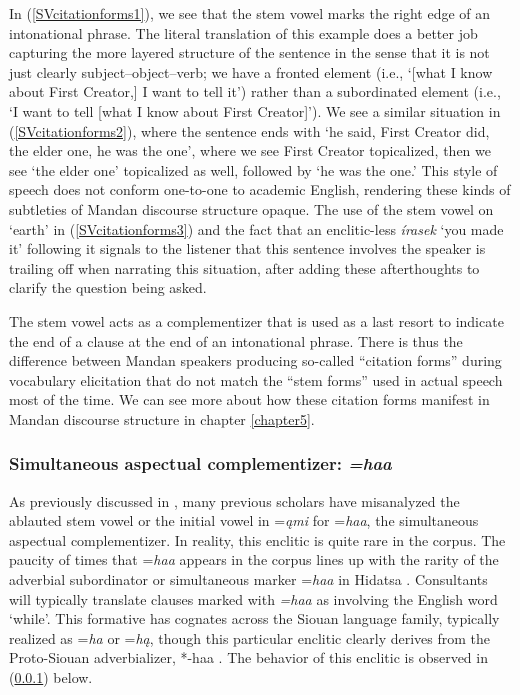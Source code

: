 In (\ref{SVcitationforms1}), we see that the stem vowel marks the right edge of an intonational phrase. The literal translation of this example does a better job capturing the more layered structure of the sentence in the sense that it is not just clearly subject--object--verb; we have a fronted element (i.e., `[what I know about First Creator,] I want to tell it') rather than a subordinated element (i.e., `I want to tell [what I know about First Creator]'). We see a similar situation in (\ref{SVcitationforms2}), where the sentence ends with `he said, First Creator did, the elder one, he was the one', where we see First Creator topicalized, then we see `the elder one' topicalized as well, followed by `he was the one.' This style of speech does not conform one-to-one to academic English, rendering these kinds of subtleties of Mandan discourse structure opaque. The use of the stem vowel on `earth' in (\ref{SVcitationforms3}) and the fact that an enclitic-less \textit{írasek} `you made it' following it signals to the listener that this sentence involves the speaker is trailing off when narrating this situation, after adding these afterthoughts to clarify the question being asked.

The stem vowel acts as a complementizer that is used as a last resort to indicate the end of a clause at the end of an intonational phrase. There is thus the difference between Mandan speakers producing so-called ``citation forms'' during vocabulary elicitation that do not match the ``stem forms'' used in actual speech most of the time. We can see more about how these citation forms manifest in Mandan discourse structure in chapter \ref{chapter5}.

\subsubsection{Simultaneous aspectual complementizer: \textit{=haa}}\label{simultaneousaspectualenclitic}

As previously discussed in , many previous scholars have misanalyzed the ablauted stem vowel or the initial vowel in =\textit{ąmi} for =\textit{haa}, the simultaneous aspectual complementizer. In reality, this enclitic is quite rare in the corpus. The paucity of times that =\textit{haa} appears in the corpus lines up with the rarity of the adverbial subordinator or simultaneous marker =\textit{haa} in Hidatsa \citep[530]{park2012}. Consultants will typically translate clauses marked with \textit{=haa} as involving the English word `while'. This formative has cognates across the Siouan language family, typically realized as =\textit{ha} or =\textit{hą}, though this particular enclitic clearly derives from the Proto-Siouan adverbializer, *-haa \citep{rankin2015}. The behavior of this enclitic is observed in (\ref{simultaneousaspectualenclitic}) below.

